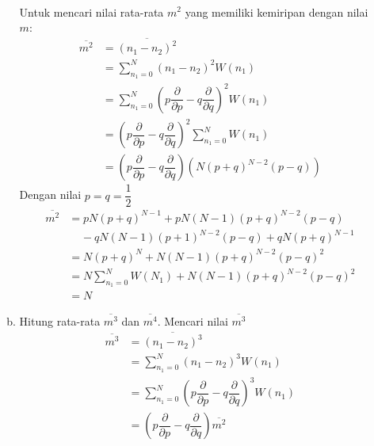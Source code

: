 \begin{enumerate}
\begin{enumerate}[(a)]
\begin{equation*}
\begin{split}
            \end{split}
        \end{equation*}
        Untuk mencari nilai rata-rata $m^2$ yang memiliki kemiripan dengan nilai $m$:
        \begin{equation*}
            \begin{split}
                \overline{m^2}&=\overline{(n_1-n_2)^2}\\
                &=\sum_{n_1=0}^N (n_1-n_2)^2 W(n_1)\\
                &=\sum_{n_1=0}^N \left(p\dfrac{\partial}{\partial p}-q \dfrac{\partial}{\partial q}\right)^2 W(n_1)\\
                &=\left(p\dfrac{\partial}{\partial p}-q \dfrac{\partial}{\partial q}\right)^2 \sum_{n_1=0}^N W(n_1)\\
                &=\left(p\dfrac{\partial}{\partial p} -q \dfrac{\partial}{\partial q}\right)(N(p+q)^{N-2}(p-q))
            \end{split}
        \end{equation*}
        Dengan nilai $p=q=\dfrac{1}{2}$
        \begin{equation*}
            \begin{split}
                \overline{m^2}&=pN(p+q)^{N-1}+pN(N-1)(p+q)^{N-2}(p-q)\\
                &\;\;\;\;-qN(N-1)(p+1)^{N-2}(p-q)+qN(p+q)^{N-1}\\
                &=N(p+q)^N+N(N-1)(p+q)^{N-2}(p-q)^2\\
                &=N\sum_{n_1=0}^N W(N_1)+N(N-1)(p+q)^{N-2}(p-q)^2\\
                &=N 
            \end{split}
        \end{equation*}
        \item Hitung rata-rata $\overline{m^3}$ dan $\overline{m^4}$.
        Mencari nilai $\overline{m^3}$
        \begin{equation*}
            \begin{split}
                \overline{m^3}&=\overline{(n_1-n_2)^3}\\
                &=\sum_{n_1=0}^N(n_1-n_2)^3W(n_1)\\
                &=\sum_{n_1=0}^N\left(p\dfrac{\partial}{\partial p}-q\dfrac{\partial}{\partial q}\right)^3W(n_1)\\
                &=\left(p\dfrac{\partial}{\partial p}-q\dfrac{\partial}{\partial q}\right)\overline{m^2}\\

\end{split}
\end{equation*}
\end{enumerate}
\end{enumerate}
